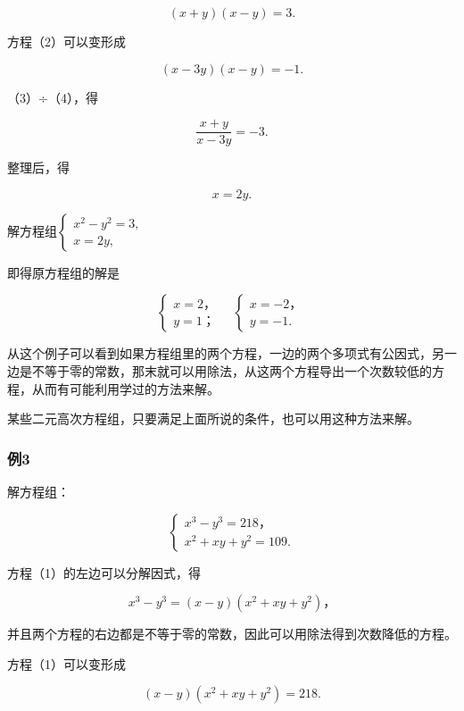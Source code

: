 \[
(x + y) (x - y) = 3. \tag{3}
\]

方程（2）可以变形成

\[
(x - 3 y) (x - y) = - 1. \tag{4}
\]

（3）÷（4），得

\[
\frac{x + y}{x - 3 y} = - 3.
\]

整理后，得

\[
x = 2 y. \tag{5}
\]

解方程组\(\left\{ \begin{array}{l} x^{2} - y^{2} = 3, \\ x = 2y, \end{array} \right.\)

即得原方程组的解是

\[
\left\{ \begin{array}{l} x = 2\text{，} \\ y = 1\text{；} \end{array} \right. \quad \left\{ \begin{array}{l} x = - 2\text{，} \\ y = - 1. \end{array} \right.
\]

从这个例子可以看到如果方程组里的两个方程，一边的两个多项式有公因式，另一边是不等于零的常数，那末就可以用除法，从这两个方程导出一个次数较低的方程，从而有可能利用学过的方法来解。

某些二元高次方程组，只要满足上面所说的条件，也可以用这种方法来解。

\subsubsection{例3}

解方程组：

\[
\left\{ \begin{array}{l} x ^ {3} - y ^ {3} = 218\text{，} \\ x ^ {2} + x y + y ^ {2} = 109. \end{array} \right. \tag{1}
\]

 方程（1）的左边可以分解因式，得

\[
x ^ {3} - y ^ {3} = (x - y) \left(x ^ {2} + x y + y ^ {2}\right)\text{，}
\]

并且两个方程的右边都是不等于零的常数，因此可以用除法得到次数降低的方程。

 方程（1）可以变形成

\[
(x - y) \left(x ^ {2} + x y + y ^ {2}\right) = 218. \tag{3}
\]

